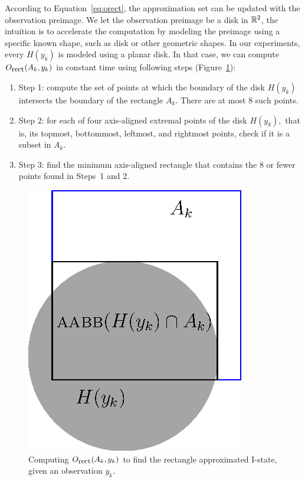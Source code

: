 According to Equation~\ref{eq:orect}, the approximation set can be updated with
the observation preimage. 
%
We let the observation preimage be a disk in $\mathbb{R}^2$, the intuition is to accelerate the computation by modeling the preimage using a specific known shape, such as disk or other geometric shapes. 
%
In our experiments, every $H(y_k)$ is modeled using a planar disk.  
In that case, we can compute $O_{\mbox{\small rect}}(A_k, y_k)$ in constant time using following
steps (Figure~\ref{fig:orect}): 
\begin{enumerate}
\item Step 1: compute the set of points at which the boundary of the disk
  $H(y_{k})$ intersects the boundary of the rectangle $A_k$. 
  There are at most $8$ such points.
  
\item Step 2: for each of four axis-aligned extremal points of the disk
  $H(y_{k}),$ that is, its topmost, bottommost, leftmost, and rightmost
  points, check if it is a subset in $A_k$.

\item Step 3: find the minimum axis-aligned rectangle that contains the
  8 or fewer points found in Steps~1 and 2.
\end{enumerate}

\begin{figure} 
  \centering
  \includegraphics[scale=1]{figs/circlerect}
  \caption{Computing $O_{\mbox{\small rect}}(A_k, y_{k})$ to find the rectangle approximated I-state, 
    given an observation $y_{k}$.}
  \label{fig:orect}
\end{figure}


